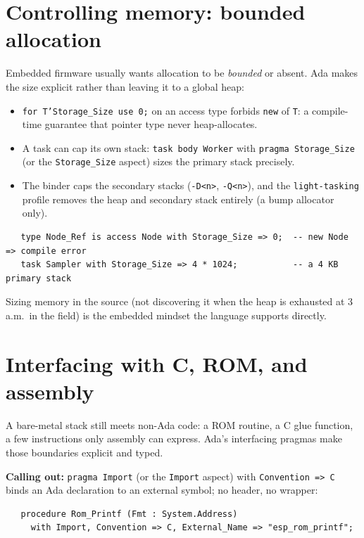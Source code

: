 \section{Controlling memory: bounded allocation}
\label{sec:memory}

Embedded firmware usually wants allocation to be \emph{bounded} or absent. Ada
makes the size explicit rather than leaving it to a global heap:

\begin{itemize}
  \item \texttt{for T'Storage\_Size use 0;} on an access type forbids
        \texttt{new} of \texttt{T}: a compile-time guarantee that pointer type
        never heap-allocates.
  \item A task can cap its own stack: \texttt{task body Worker} with
        \texttt{pragma Storage\_Size} (or the \texttt{Storage\_Size} aspect) sizes
        the primary stack precisely.
  \item The binder caps the secondary stacks (\texttt{-D<n>}, \texttt{-Q<n>}), and
        the \texttt{light-tasking} profile removes the heap and secondary stack
        entirely (a bump allocator only).
\end{itemize}

\begin{lstlisting}
   type Node_Ref is access Node with Storage_Size => 0;  -- new Node => compile error
   task Sampler with Storage_Size => 4 * 1024;           -- a 4 KB primary stack
\end{lstlisting}

Sizing memory in the source (not discovering it when the heap is exhausted at
3 a.m.\ in the field) is the embedded mindset the language supports directly.

\section{Interfacing with C, ROM, and assembly}
\label{sec:interfacing}

A bare-metal stack still meets non-Ada code: a ROM routine, a C glue function, a
few instructions only assembly can express. Ada's interfacing pragmas make those
boundaries explicit and typed.

\textbf{Calling out:} \texttt{pragma Import} (or the \texttt{Import} aspect)
with \texttt{Convention => C} binds an Ada declaration to an external symbol; no
header, no wrapper:

\begin{lstlisting}
   procedure Rom_Printf (Fmt : System.Address)
     with Import, Convention => C, External_Name => "esp_rom_printf";
\end{lstlisting}

